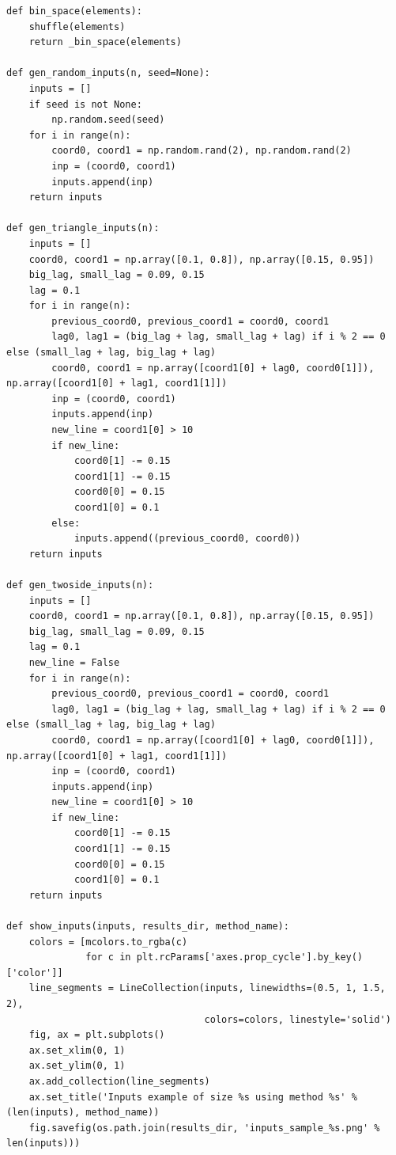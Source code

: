 \documentclass[letterpaper]{article}
\begin{document}
\begin{lstlisting}
def bin_space(elements):
    shuffle(elements)
    return _bin_space(elements)

def gen_random_inputs(n, seed=None):
    inputs = []
    if seed is not None:
        np.random.seed(seed)
    for i in range(n):
        coord0, coord1 = np.random.rand(2), np.random.rand(2)
        inp = (coord0, coord1)
        inputs.append(inp)
    return inputs

def gen_triangle_inputs(n):
    inputs = []
    coord0, coord1 = np.array([0.1, 0.8]), np.array([0.15, 0.95])
    big_lag, small_lag = 0.09, 0.15
    lag = 0.1
    for i in range(n):
        previous_coord0, previous_coord1 = coord0, coord1
        lag0, lag1 = (big_lag + lag, small_lag + lag) if i % 2 == 0 else (small_lag + lag, big_lag + lag)
        coord0, coord1 = np.array([coord1[0] + lag0, coord0[1]]), np.array([coord1[0] + lag1, coord1[1]])
        inp = (coord0, coord1)
        inputs.append(inp)
        new_line = coord1[0] > 10
        if new_line:
            coord0[1] -= 0.15
            coord1[1] -= 0.15
            coord0[0] = 0.15
            coord1[0] = 0.1
        else:
            inputs.append((previous_coord0, coord0))
    return inputs

def gen_twoside_inputs(n):
    inputs = []
    coord0, coord1 = np.array([0.1, 0.8]), np.array([0.15, 0.95])
    big_lag, small_lag = 0.09, 0.15
    lag = 0.1
    new_line = False
    for i in range(n):
        previous_coord0, previous_coord1 = coord0, coord1
        lag0, lag1 = (big_lag + lag, small_lag + lag) if i % 2 == 0 else (small_lag + lag, big_lag + lag)
        coord0, coord1 = np.array([coord1[0] + lag0, coord0[1]]), np.array([coord1[0] + lag1, coord1[1]])
        inp = (coord0, coord1)
        inputs.append(inp)
        new_line = coord1[0] > 10
        if new_line:
            coord0[1] -= 0.15
            coord1[1] -= 0.15
            coord0[0] = 0.15
            coord1[0] = 0.1
    return inputs

def show_inputs(inputs, results_dir, method_name):
    colors = [mcolors.to_rgba(c)
              for c in plt.rcParams['axes.prop_cycle'].by_key()['color']]
    line_segments = LineCollection(inputs, linewidths=(0.5, 1, 1.5, 2),
                                   colors=colors, linestyle='solid')
    fig, ax = plt.subplots()
    ax.set_xlim(0, 1)
    ax.set_ylim(0, 1)
    ax.add_collection(line_segments)
    ax.set_title('Inputs example of size %s using method %s' % (len(inputs), method_name))
    fig.savefig(os.path.join(results_dir, 'inputs_sample_%s.png' % len(inputs)))


\end{lstlisting}
\end{document}

